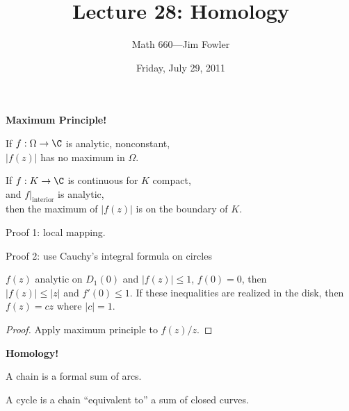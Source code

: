 \documentclass[14pt]{chalkfjord}
\title{Lecture 28: Homology}
\author{Math 660---Jim Fowler}
\date{Friday, July 29, 2011}
\begin{document}
\begin{frame}\titlepage\end{frame}

\begin{frame}
  \Huge
  \textbf{Maximum Principle!}
\end{frame}

\begin{frame}
  \begin{theorem}
    If $f : \Omega \to \C$ is analytic, nonconstant, \\
    \quad $|f(z)|$ has no maximum in $\Omega$.
  \end{theorem}

  \begin{corollary}
    If $f : K \to \C$ is continuous for $K$ compact, \\
    \quad and $f |_{\mbox{interior}}$ is analytic, \\
    \quad then the maximum of $|f(z)|$ is on the boundary of $K$.
  \end{corollary}
\end{frame}

\begin{frame}
  Proof 1: local mapping.

  Proof 2: use Cauchy's integral formula on circles
\end{frame}

\begin{frame}
  \begin{lemma}[Schwarz]
    $f(z)$ analytic on $D_1(0)$ and $|f(z)| \leq 1$, $f(0) = 0$, then
    \\
    \quad $|f(z)| \leq |z|$ and $f'(0) \leq 1$.
    If these inequalities are realized in the disk, then \\
    \quad $f(z) = cz$ where $|c| = 1$.
  \end{lemma}
  \pause
  \begin{proof}
    Apply maximum principle to $f(z)/z$.
  \end{proof}
\end{frame}

\begin{frame}
  \Huge
  \textbf{Homology!}
\end{frame}

\begin{frame}
  A chain is a formal sum of arcs.

  A cycle is a chain ``equivalent to'' a sum of closed curves.

\end{frame}
\end{document}
